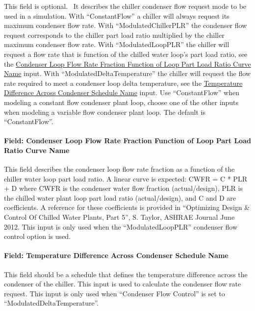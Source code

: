 This field is optional.~ It describes the chiller condenser flow request mode to be used in a simulation. With ``ConstantFlow'' a chiller will always request its maximum condenser flow rate. With ``ModulatedChillerPLR'' the condenser flow request corresponds to the chiller part load ratio multiplied by the chiller maximum condenser flow rate.  With  ``ModulatedLoopPLR'' the chiller will request a flow rate that is function of the chilled water loop's part load ratio, see the \hyperref[field-condenser-loop-flow-rate-function-of-loop-part-load-ratio-curve-name-2]{Condenser Loop Flow Rate Fraction Function of Loop Part Load Ratio Curve Name} input. With ``ModulatedDeltaTemperature'' the chiller will request the flow rate required to meet a condenser loop delta temperature, see the \hyperref[field-temperature-difference-across-condenser-schedule-name-2]{Temperature Difference Across Condenser Schedule Name} input. Use ``ConstantFlow'' when modeling a constant flow condenser plant loop, choose one of the other inputs when modeling a variable flow condenser plant loop. The default is ``ConstantFlow''.

\paragraph{Field: Condenser Loop Flow Rate Fraction Function of Loop Part Load Ratio Curve Name}\label{field-condenser-loop-flow-rate-function-of-loop-part-load-ratio-curve-name-2}

This field describes the condenser loop flow rate fraction as a function of the chiller water loop part load ratio. A linear curve is expected: CWFR = C * PLR + D where CWFR is the condenser water flow fraction (actual/design), PLR is the chilled water plant loop part load ratio (actual/design), and C and D are coefficients. A reference for these coefficients is provided in ``Optimizing Design \& Control Of Chilled Water Plants, Part 5'', S. Taylor, ASHRAE Journal June 2012.  This input is only used when the ``ModulatedLoopPLR'' condenser flow control option is used.

\paragraph{Field: Temperature Difference Across Condenser Schedule Name}\label{field-temperature-difference-across-condenser-schedule-name-2}

This field should be a schedule that defines the temperature difference across the condenser of the chiller. This input is used to calculate the condenser flow rate request. This input is only used when ``Condenser Flow Control'' is set to ``ModulatedDeltaTemperature''.


